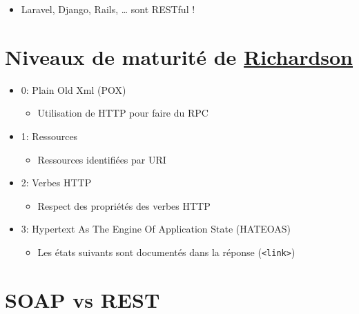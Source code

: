 \begin{itemize}
\tightlist
\item
  Laravel, Django, Rails, \ldots{} sont RESTful !
\end{itemize}

\hypertarget{niveaux-de-maturituxe9-de-richardson18}{%
\section{\texorpdfstring{Niveaux de maturité de
\href{http://martinfowler.com/articles/richardsonMaturityModel.html}{Richardson}}{Niveaux de maturité de Richardson}}\label{niveaux-de-maturituxe9-de-richardson18}}

\begin{itemize}
\tightlist
\item
  0: Plain Old Xml (POX)

  \begin{itemize}
  \tightlist
  \item
    Utilisation de HTTP pour faire du RPC
  \end{itemize}
\item
  1: Ressources

  \begin{itemize}
  \tightlist
  \item
    Ressources identifiées par URI
  \end{itemize}
\item
  2: Verbes HTTP

  \begin{itemize}
  \tightlist
  \item
    Respect des propriétés des verbes HTTP
  \end{itemize}
\item
  3: Hypertext As The Engine Of Application State (HATEOAS)

  \begin{itemize}
  \tightlist
  \item
    Les états suivants sont documentés dans la réponse
    (\textenglish{\texttt{\textless{}link\textgreater{}}})
  \end{itemize}
\end{itemize}

\hypertarget{soap-vs-rest}{%
\section{SOAP vs REST}\label{soap-vs-rest}}

